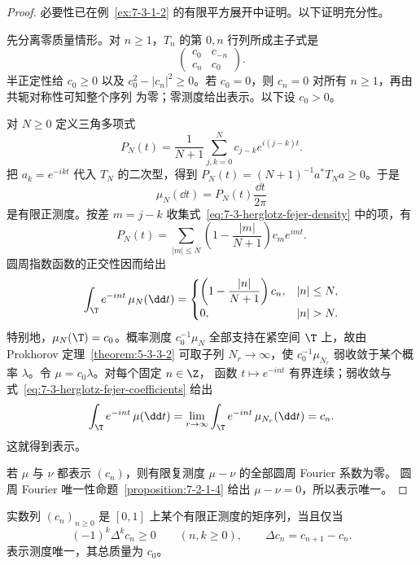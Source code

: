 \begin{proof}
必要性已在例~\ref{ex:7-3-1-2} 的有限平方展开中证明。以下证明充分性。

先分离零质量情形。对 $n\geq1$，$T_n$ 的第 $0,n$ 行列所成主子式是
\[
 \begin{pmatrix}c_0&c_{-n}\\c_n&c_0\end{pmatrix}.
\]
半正定性给 $c_0\geq0$ 以及
$c_0^2-|c_n|^2\geq0$。若 $c_0=0$，则 $c_n=0$ 对所有 $n\geq1$，再由共轭对称性可知整个序列
为零；零测度给出表示。以下设 $c_0>0$。

对 $N\geq0$ 定义三角多项式
\begin{equation}\label{eq:7-3-herglotz-fejer-density}
 P_N(t)=\frac{1}{N+1}\sum_{j,k=0}^Nc_{j-k}e^{i(j-k)t}.
\end{equation}
把 $a_k=e^{-ikt}$ 代入 $T_N$ 的二次型，得到
$P_N(t)=(N+1)^{-1}a^*T_Na\geq0$。于是
\[
 \mu_N(\dd t)=P_N(t)\frac{\dd t}{2\pi}
\]
是有限正测度。按差 $m=j-k$ 收集式~\eqref{eq:7-3-herglotz-fejer-density} 中的项，有
\[
 P_N(t)=\sum_{|m|\leq N}
 \left(1-\frac{|m|}{N+1}\right)c_me^{imt}.
\]
圆周指数函数的正交性因而给出
\begin{equation}\label{eq:7-3-herglotz-fejer-coefficients}
 \int_\T e^{-int}\,\mu_N(\dd t)
 =
 \begin{cases}
 \left(1-\dfrac{|n|}{N+1}\right)c_n,& |n|\leq N,\\[4pt]
 0,& |n|>N.
 \end{cases}
\end{equation}
特别地，$\mu_N(\T)=c_0$。概率测度 $c_0^{-1}\mu_N$ 全部支持在紧空间 $\T$ 上，故由
Prokhorov 定理~\ref{theorem:5-3-3-2} 可取子列 $N_r\to\infty$，使
$c_0^{-1}\mu_{N_r}$ 弱收敛于某个概率 $\lambda$。令 $\mu=c_0\lambda$。对每个固定 $n\in\Z$，
函数 $t\mapsto e^{-int}$ 有界连续；弱收敛与
式~\eqref{eq:7-3-herglotz-fejer-coefficients} 给出
\[
 \int_\T e^{-int}\,\mu(\dd t)
 =\lim_{r\to\infty}\int_\T e^{-int}\,\mu_{N_r}(\dd t)=c_n.
\]
这就得到表示。

若 $\mu$ 与 $\nu$ 都表示 $(c_n)$，则有限复测度 $\mu-\nu$ 的全部圆周 Fourier 系数为零。
圆周 Fourier 唯一性命题~\ref{proposition:7-2-1-4} 给出 $\mu-\nu=0$，所以表示唯一。
\end{proof}

\begin{theorem}\label{theorem:7-3-1-3}
实数列 $(c_n)_{n\geq0}$ 是 $[0,1]$ 上某个有限正测度的矩序列，当且仅当
\begin{equation}\label{eq:7-3-hausdorff-complete-monotonicity}
 (-1)^k\Delta^kc_n\geq0\qquad(n,k\geq0),
 \qquad \Delta c_n=c_{n+1}-c_n.
\end{equation}
表示测度唯一，其总质量为 $c_0$。
\end{theorem}

